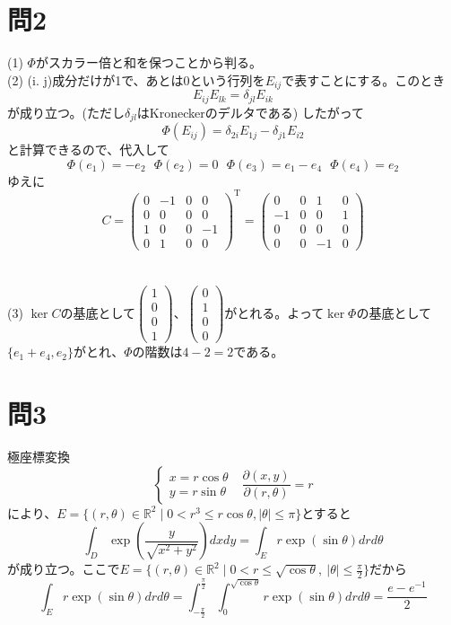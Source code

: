 ﻿\documentclass{jsarticle}
\begin{document}
\section*{問2}
\noindent
(1) $\Phi$がスカラー倍と和を保つことから判る。\\
(2) (i. j)成分だけが1で、あとは0という行列を$E_{ij}$で表すことにする。このとき
$$
E_{ij}E_{lk} = \delta_{jl}E_{ik}
$$
が成り立つ。(ただし$\delta_{jl}$はKroneckerのデルタである) したがって
$$
\Phi(E_{ij}) = \delta_{2i}E_{1j} - \delta_{j1}E_{i2}
$$
と計算できるので、代入して
$$
\Phi(e_1)  =  - e_2  \ \ \
\Phi(e_2)  =  0  \ \ \
\Phi(e_3)  =  e_1 - e_4 \ \ \
\Phi(e_4)  =  e_2
$$
ゆえに
$$
C  = \begin{pmatrix} 0&-1&0&0 \\ 0&0&0&0 \\ 1&0&0&-1 \\ 0&1&0&0 \end{pmatrix}^{\mathrm{T}}　
 =  \begin{pmatrix} 0&0&1&0 \\ -1&0&0&1 \\ 0&0&0&0 \\ 0&0&-1&0 \end{pmatrix}
$$
\\　\\

\noindent
(3) $\ker C$の基底として$\begin{pmatrix} 1 \\ 0 \\ 0 \\ 1 \end{pmatrix}$、$\begin{pmatrix} 0 \\1 \\ 0 \\ 0 \end{pmatrix}$がとれる。よって$\ker \Phi$の基底として$\{e_1 +e_4, e_2 \}$がとれ、$\Phi$の階数は$4 - 2 = 2$である。\\


\section*{問3}
\noindent
極座標変換
$$
\begin{cases}
x = r \cos \theta \\ y = r \sin \theta \end{cases} \ \ \
\frac{\partial (x, y)}{\partial (r, \theta)} = r
$$
により、$E = \{(r, \theta) \in \mathbb{R}^2 \mid 0 < r^3 \leq r \cos \theta , |\theta| \leq \pi \}$とすると
$$
\int_D \exp( \frac{y}{ \sqrt{x^2 + y^2} } ) dxdy = \int_E r \exp(\sin \theta)drd\theta
$$
が成り立つ。ここで$E = \{(r, \theta) \in \mathbb{R}^2 \mid 0 <  r \leq \sqrt{\cos \theta} , \ |\theta| \leq \frac{\pi}{2} \}$だから
$$
\int_E r \exp(\sin \theta)drd\theta
 = \int_{- \frac{\pi}{2}}^{\frac{\pi}{2}} \int_{0}^{\sqrt{\cos \theta}}  r \exp (\sin\theta)drd\theta
 =  \frac{e - e^{-1}}{2}
$$ \\ \\
\end{document}
